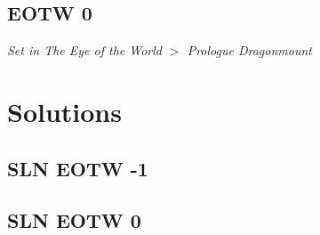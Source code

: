 \documentclass{article}
\begin{document}
\subsection*{EOTW 0}
\textit{ Set in The Eye of the World $>$ Prologue Dragonmount }  \pagebreak

\section*{Solutions}

\subsection*{SLN EOTW -1}
 \pagebreak

\subsection*{SLN EOTW 0}
\end{document}
